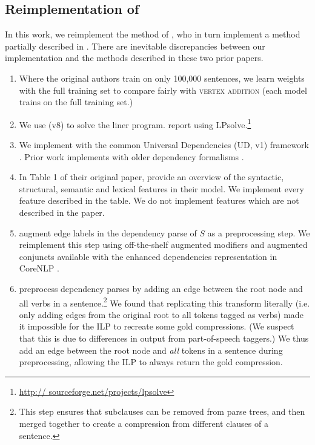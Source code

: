 \subsection{Reimplementation of \citet{filippova2013overcoming}}

In this work, we reimplement the method of \citet{filippova2013overcoming}, who in turn implement a method partially described in \citet{filippova2008dependency}.  There are inevitable discrepancies between our implementation and the methods described in these two prior papers.

\begin{enumerate}
\item{Where the original authors train on only 100,000 sentences, we learn weights with the full training set to compare fairly with \textsc{vertex addition} (each model trains on the full training set.)}
\item{We use \citet{gurobi} (v8) to solve the liner program. \citet{filippova2008dependency} report using LPsolve.\footnote{\url{http://
sourceforge.net/projects/lpsolve}}}
\item{We implement with the common Universal Dependencies (UD, v1) framework \cite{Nivre2016UniversalDV}. Prior work \cite{filippova2008dependency} implements with older dependency formalisms \cite{briscoe-etal-2006-second,Marneffe2006GeneratingTD}.} 
\item{In Table 1 of their original paper, \citet{filippova2013overcoming} provide an overview of the syntactic, structural, semantic and lexical features in their model. We implement every feature described in the table. We do not implement features which are not described in the paper.}
\item{\citet{filippova2013overcoming} augment edge labels in the dependency parse of $S$ as a preprocessing step. We reimplement this step using off-the-shelf augmented modifiers and augmented conjuncts available with the enhanced dependencies representation in CoreNLP \cite{Schuster2016EnhancedEU}.}
\item{\citet{filippova2013overcoming} preprocess dependency parses by adding an edge between the root node and all verbs in a sentence.\footnote{This step ensures that subclauses can be removed from parse trees, and then merged together to create a compression from different clauses of a sentence.} We found that replicating this transform literally (i.e. only adding edges from the original root to all tokens tagged as verbs) made it impossible for the ILP to recreate some gold compressions. (We suspect that this is due to differences in output from part-of-speech taggers.) We thus add an edge between the root node and \textit{all} tokens in a sentence during preprocessing, allowing the ILP to always return the gold compression.}
\end{enumerate}

